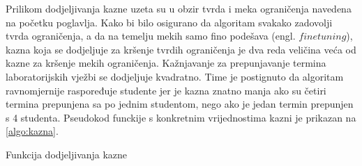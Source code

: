 \documentclass[times, utf8, zavrsni]{fer}
\begin{document}
Prilikom dodjeljivanja kazne uzeta su u obzir tvrda i meka ograničenja navedena na početku poglavlja. Kako bi bilo osigurano
da algoritam svakako zadovolji tvrda ograničenja, a da na temelju mekih samo fino podešava (engl. $fine tuning$), kazna koja
se dodjeljuje za kršenje tvrdih ograničenja je dva reda veličina veća od kazne za kršenje mekih ograničenja. Kažnjavanje
za prepunjavanje termina laboratorijskih vježbi se dodjeljuje kvadratno. Time je postignuto da algoritam ravnomjernije
raspoređuje studente jer je kazna znatno manja ako su četiri termina prepunjena sa po jednim studentom, nego ako je
jedan termin prepunjen s 4 studenta. Pseudokod funckije s konkretnim vrijednostima kazni je prikazan na \ref{algo:kazna}.


\begin{algorithm}
\caption{Funkcija dodjeljivanja kazne}
\label{algo:kazna}
\begin{algorithmic}

  \ENDIF
  \ENDIF
  \ENDIF

\ENDFOR

  \ENDIF
  \ENDIF

\ENDFOR

\end{algorithmic}
\end{algorithm}
\end{document}
